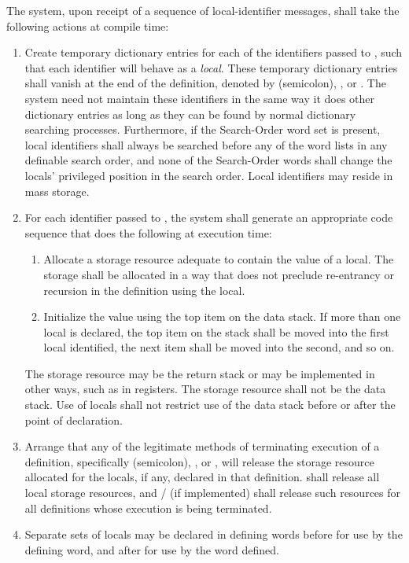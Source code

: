 The system, upon receipt of a sequence of local-identifier messages,
shall take the following actions at compile time:
\begin{enumerate}
\item Create temporary dictionary entries for each of the
	identifiers passed to , such that each identifier
	will behave as a \emph{local}. These temporary dictionary
	entries shall vanish at the end of the definition, denoted by
	\word[core]{;} (semicolon), , or
	. The system need not maintain these
	identifiers in the same way it does other dictionary entries
	as long as they can be found by normal dictionary searching
	processes. Furthermore, if the Search-Order word set is present,
	local identifiers shall always be searched before any of the
	word lists in any definable search order, and none of the
	Search-Order words shall change the locals' privileged position
	in the search order. Local identifiers may reside in mass storage.

\item For each identifier passed to , the system shall
	generate an appropriate code sequence that does the following at
	execution time:
	\begin{enumerate}
	\item Allocate a storage resource adequate to contain the value
		of a local. The storage shall be allocated in a way that
		does not preclude re-entrancy or recursion in the definition
		using the local.
	\item Initialize the value using the top item on the data stack.
		If more than one local is declared, the top item on the
		stack shall be moved into the first local identified, the
		next item shall be moved into the second, and so on.
	\end{enumerate}

	The storage resource may be the return stack or may be
	implemented in other ways, such as in registers. The storage
	resource shall not be the data stack. Use of locals shall not
	restrict use of the data stack before or after the point of
	declaration.

\item Arrange that any of the legitimate methods of terminating
	execution of a definition, specifically \word[core]{;}
	(semicolon), ,  or
	, will release the storage resource allocated
	for the locals, if any, declared in that definition.
	 shall release all local storage resources,
	and  /  (if
	implemented) shall release such resources for all definitions
	whose execution is being terminated.

\item Separate sets of locals may be declared in defining words
	before  for use by the defining word, and
	after  for use by the word defined.
\end{enumerate}

